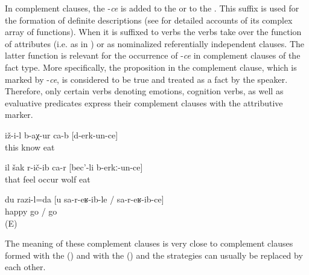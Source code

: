 In complement clauses, the  -\textit{ce} is added to the   or to the  . This suffix is used for the formation of definite descriptions (see  for detailed accounts of its complex array of functions). When it is suffixed to verbs the verbs take over the function of attributes (i.e. as  in ) or as nominalized referentially independent clauses. The latter function is relevant for the occurrence of -\textit{ce} in complement clauses of the fact type. More specifically, the proposition in the complement clause, which is marked by -\textit{ce}, is considered to be true and treated as a fact by the speaker. Therefore, only certain verbs denoting emotions, cognition verbs, as well as evaluative predicates express their complement clauses with the attributive marker. 
%
\begin{exe}
	\ex	\label{ex:He got to know that (they) ate (them)}
	\gll	iž-i-l	b-aχ-ur	ca-b	[d-erk-un-ce]\\
		this	know		eat\\
	\glt	{}

	\ex	\label{ex:‎‎She suspected that the wolf had eaten (the sisters)}
	\gll	il	šak	r-ič-ib	ca-r	[bec'-li	b-erkː-un-ce]\\
		that	feel	occur		wolf	eat\\
	\glt	{}

	\ex	\label{ex:‎‎‎I am happy that you came}
	\gll	du	razi-l=da	[u	sa-r-eʁ-ib-le	/	sa-r-eʁ-ib-ce]\\
			happy		go	/	go\\
	\glt	{} (E)
\end{exe}

The meaning of these complement clauses is very close to complement clauses formed with the   () and with the   () and the strategies can usually be replaced by each other.

